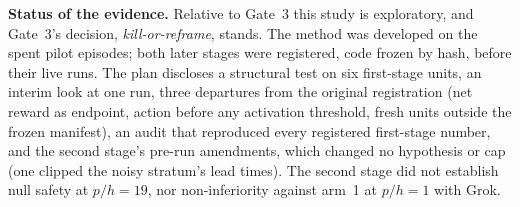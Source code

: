 \textbf{Status of the evidence.} Relative to Gate~3 this study is exploratory, and
Gate~3's decision, \emph{kill-or-reframe}, stands. The method was developed on the spent
pilot episodes; both later stages were registered, code frozen by hash, before their live
runs. The plan discloses a structural test on six first-stage units, an interim look at one
run, three departures from the original registration (net reward as endpoint, action before
any activation threshold, fresh units outside the frozen manifest), an audit that reproduced
every registered first-stage number, and the second stage's pre-run amendments, which changed
no hypothesis or cap (one clipped the noisy stratum's lead times). The second stage did not
establish null safety at $p/h = 19$, nor non-inferiority against arm~1 at $p/h = 1$ with Grok.
